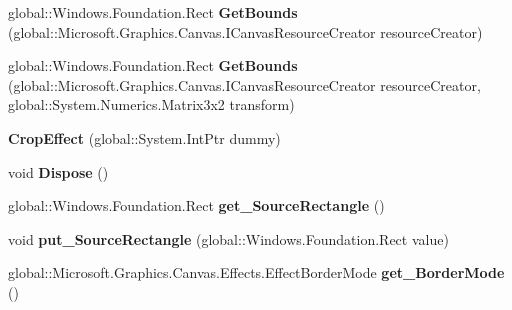 \begin{DoxyCompactItemize}
\mbox{\label{class_microsoft_1_1_graphics_1_1_canvas_1_1_effects_1_1_crop_effect_a9205352b6c62c823e67992127aa11346}} 
global\+::\+Windows.\+Foundation.\+Rect {\bfseries Get\+Bounds} (global\+::\+Microsoft.\+Graphics.\+Canvas.\+I\+Canvas\+Resource\+Creator resource\+Creator)
\item 
\mbox{\label{class_microsoft_1_1_graphics_1_1_canvas_1_1_effects_1_1_crop_effect_a16b720a896e82a3c3dd7f6de5b04f6f0}} 
global\+::\+Windows.\+Foundation.\+Rect {\bfseries Get\+Bounds} (global\+::\+Microsoft.\+Graphics.\+Canvas.\+I\+Canvas\+Resource\+Creator resource\+Creator, global\+::\+System.\+Numerics.\+Matrix3x2 transform)
\item 
\mbox{\label{class_microsoft_1_1_graphics_1_1_canvas_1_1_effects_1_1_crop_effect_a0c77e082f46f52291276ece0f7fae253}} 
{\bfseries Crop\+Effect} (global\+::\+System.\+Int\+Ptr dummy)
\item 
\mbox{\label{class_microsoft_1_1_graphics_1_1_canvas_1_1_effects_1_1_crop_effect_a9b3ea35f19a680f460f21d9a9e788048}} 
void {\bfseries Dispose} ()
\item 
\mbox{\label{class_microsoft_1_1_graphics_1_1_canvas_1_1_effects_1_1_crop_effect_a7623c2c77a5d02cdfdd9c57daadea17b}} 
global\+::\+Windows.\+Foundation.\+Rect {\bfseries get\+\_\+\+Source\+Rectangle} ()
\item 
\mbox{\label{class_microsoft_1_1_graphics_1_1_canvas_1_1_effects_1_1_crop_effect_a1d926a1f046dba84ddf63f41d43adb8d}} 
void {\bfseries put\+\_\+\+Source\+Rectangle} (global\+::\+Windows.\+Foundation.\+Rect value)
\item 
\mbox{\label{class_microsoft_1_1_graphics_1_1_canvas_1_1_effects_1_1_crop_effect_ad455f8e79c452f9b75bdc6cce955b14c}} 
global\+::\+Microsoft.\+Graphics.\+Canvas.\+Effects.\+Effect\+Border\+Mode {\bfseries get\+\_\+\+Border\+Mode} ()

\end{DoxyCompactItemize}
